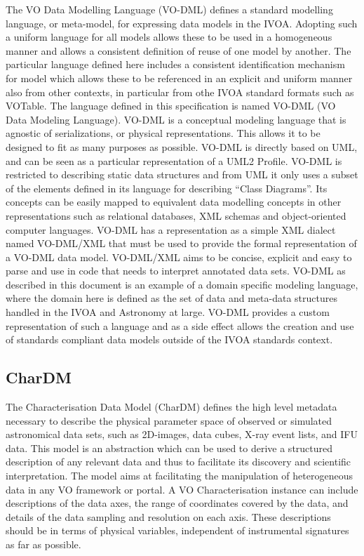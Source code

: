 \documentclass[11pt,a4paper]{ivoa}
\begin{document}
The VO Data Modelling Language (VO-DML) \citep{2018ivoa.spec.0910L} defines a standard modelling language, or meta-model, for 
expressing data models in the IVOA. Adopting such a uniform language for all models allows 
these to be used in a homogeneous manner and allows a consistent definition of reuse of one 
model by another. The particular language defined here includes a consistent identification 
mechanism for model which allows these to be referenced in an explicit and uniform manner 
also from other contexts, in particular from othe IVOA standard formats such as VOTable. 
The language defined in this specification is named VO-DML (VO Data Modeling Language). 
VO-DML is a conceptual modeling language that is agnostic of serializations, or physical 
representations. This allows it to be designed to fit as many purposes as possible. VO-DML 
is directly based on UML, and can be seen as a particular representation of a UML2 Profile. 
VO-DML is restricted to describing static data structures and from UML it only uses a subset 
of the elements defined in its language for describing ``Class Diagrams''. Its concepts can 
be easily mapped to equivalent data modelling concepts in other representations such as 
relational databases, XML schemas and object-oriented computer languages. VO-DML has a 
representation as a simple XML dialect named VO-DML/XML that must be used to provide the 
formal representation of a VO-DML data model. VO-DML/XML aims to be concise, explicit and 
easy to parse and use in code that needs to interpret annotated data sets. VO-DML as 
described in this document is an example of a domain specific modeling language, where the 
domain here is defined as the set of data and meta-data structures handled in the IVOA and 
Astronomy at large. VO-DML provides a custom representation of such a language and as a 
side effect allows the creation and use of standards compliant data models outside of the 
IVOA standards context. 

\subsection{CharDM} 

The Characterisation Data Model (CharDM) \citep{2008ivoa.spec.0325L} defines the high level metadata necessary to describe the 
physical parameter space of observed or simulated astronomical data sets, such as 2D-images, 
data cubes, X-ray event lists, and IFU data. This model is an abstraction which can be used 
to derive a structured description of any relevant data and thus to facilitate its discovery 
and scientific interpretation. The model aims at facilitating the manipulation of heterogeneous 
data in any VO framework or portal. A VO Characterisation instance can include descriptions of 
the data axes, the range of coordinates covered by the data, and details of the data sampling 
and resolution on each axis. These descriptions should be in terms of physical variables, 
independent of instrumental signatures as far as possible.
\end{document}
